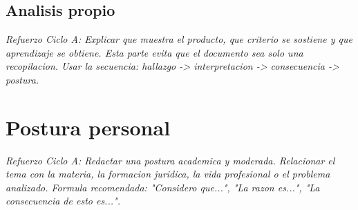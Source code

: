 \documentclass[
	spanish,
	letterpaper, oneside
]{article}
\begin{document}
%

\subsection{Analisis propio}

\textit{Refuerzo Ciclo A: Explicar que muestra el producto, que criterio se sostiene y que aprendizaje se obtiene. Esta parte evita que el documento sea solo una recopilacion. Usar la secuencia: hallazgo -> interpretacion -> consecuencia -> postura.}

\section{Postura personal}

\textit{Refuerzo Ciclo A: Redactar una postura academica y moderada. Relacionar el tema con la materia, la formacion juridica, la vida profesional o el problema analizado. Formula recomendada: "Considero que...", "La razon es...", "La consecuencia de esto es...".}

\end{document}
